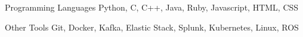 


\begin{cvskills}


\cvskill
{Programming Languages} %
{Python, C, C++, Java, Ruby, Javascript, HTML, CSS} %


\cvskill
{Other Tools} %
{Git, Docker, Kafka, Elastic Stack, Splunk, Kubernetes, Linux, ROS} %


\end{cvskills}
